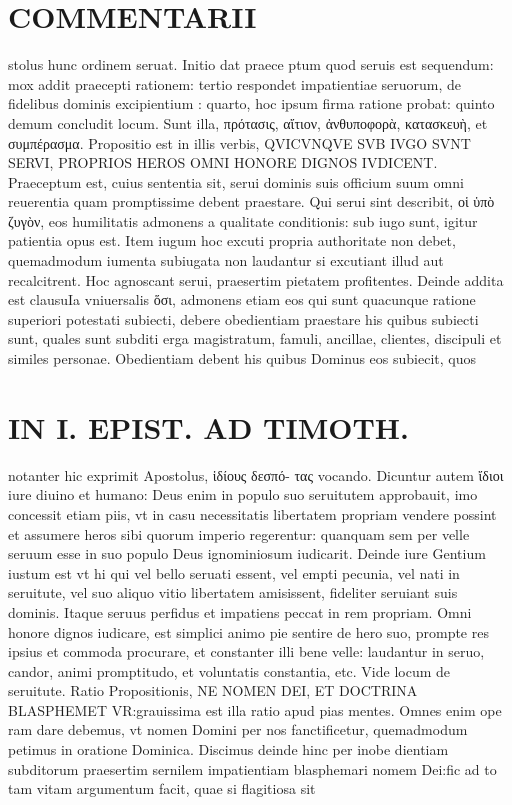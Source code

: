 \documentclass{article}
\begin{document}
\begin{pages}
\section*{COMMENTARII }
\marginpar{[ p.144 ]}\pstart stolus hunc ordinem seruat. Initio dat praece ptum quod seruis est sequendum: mox addit praecepti rationem: tertio respondet impatientiae seruorum, de fidelibus dominis excipientium : quarto, hoc ipsum firma ratione probat: quinto demum concludit locum. Sunt illa, πρότασις, αἴτιον, ἀνθυποφορὰ, κατασκευὴ, et συμπέρασμα.  \pend\pstart Propositio est in illis verbis, QVICVNQVE SVB IVGO SVNT SERVI, PROPRIOS HEROS OMNI HONORE DIGNOS IVDICENT. Praeceptum est, cuius sententia sit, serui dominis suis officium suum omni reuerentia quam promptissime debent praestare.  \pend\pstart Qui serui sint describit, οἱ ὑπὸ ζυγὸν, eos humilitatis admonens a qualitate conditionis: sub iugo sunt, igitur patientia opus est. Item iugum hoc excuti propria authoritate non debet, quemadmodum iumenta subiugata non laudantur si excutiant illud aut recalcitrent. Hoc agnoscant serui, praesertim pietatem profitentes. Deinde addita est clausuIa vniuersalis ὅσι, admonens etiam eos qui sunt quacunque ratione superiori potestati subiecti, debere obedientiam praestare his quibus subiecti sunt, quales sunt subditi erga magistratum, famuli, ancillae, clientes, discipuli et similes personae. Obedientiam debent his quibus Dominus eos subiecit, quos  \pend
\section*{IN I. EPIST. AD TIMOTH. }
\marginpar{[ p.145 ]}\pstart notanter hic exprimit Apostolus, ἱδίους δεσπό- τας vocando. Dicuntur autem ἴδιοι iure diuino et humano: Deus enim in populo suo seruitutem approbauit, imo concessit etiam piis, vt in casu necessitatis libertatem propriam vendere possint et assumere heros sibi quorum imperio regerentur: quanquam sem per velle seruum esse in suo populo Deus ignominiosum iudicarit. Deinde iure Gentium iustum est vt hi qui vel bello seruati essent, vel empti pecunia, vel nati in seruitute, vel suo aliquo vitio libertatem amisissent, fideliter seruiant suis dominis. Itaque seruus perfidus et impatiens peccat in rem propriam. Omni honore dignos iudicare, est simplici animo pie sentire de hero suo, prompte res ipsius et commoda procurare, et constanter illi bene velle: laudantur in seruo, candor, animi promptitudo, et voluntatis constantia, etc. Vide locum de seruitute.  \pend\pstart Ratio Propositionis, NE NOMEN DEI, ET DOCTRINA BLASPHEMET VR:grauissima est illa ratio apud pias mentes. Omnes enim ope ram dare debemus, vt nomen Domini per nos fanctificetur, quemadmodum petimus in oratione Dominica. Discimus deinde hinc per inobe dientiam subditorum praesertim sernilem impatientiam blasphemari nomem Dei:fic ad to tam vitam argumentum facit, quae si flagitiosa sit  \pend

\end{pages}
\end{document}
